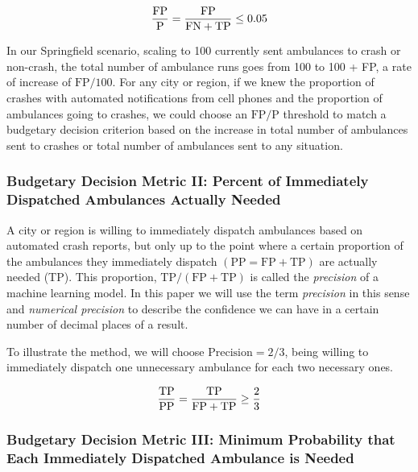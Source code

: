 \begin{equation} \label{eq:budget_1}\hfil
\frac{ \text{FP}}{\text{P}}
=
\frac{ \text{FP}}{\text{FN} + \text{TP}}
\le 0.05
\end{equation}

 In our Springfield scenario, scaling to 100 currently sent ambulances to crash or non-crash, the total number of ambulance runs goes from 100 to 100 + FP, a rate of increase of $\text{FP}/100$.  For any city or region, if we knew the proportion of crashes with automated notifications from cell phones and the proportion of ambulances going to crashes, we could choose an
 $\text{FP}/\text{P}$
 threshold to match a budgetary decision criterion based on the increase in total number of ambulances sent to crashes or total number of ambulances sent to any situation.


\subsubsection{Budgetary Decision Metric II:  Percent of Immediately Dispatched Ambulances Actually Needed}
\label{political_decisions_precision}

A city or region is willing to immediately dispatch ambulances based on automated crash reports, but only up to the point where a certain proportion of the ambulances they immediately dispatch 
$(\text{PP} = \text{FP} + \text{TP})$ 
are actually needed (TP).  This proportion, 
$\text{TP}/(\text{FP} + \text{TP})$ 
is called the {\it precision} of a machine learning model.  In this paper we will use the term {\it precision} in this sense and {\it numerical precision} to describe the confidence we can have in a certain number of decimal places of a result.

To illustrate the method, we will choose $\text{Precision} = 2/3$, being willing to immediately dispatch one unnecessary ambulance for each two necessary ones.

\begin{equation} \label{eq:budget_2}\hfil
\frac{ \text{TP}}{\text{PP}}
=
\frac{ \text{TP}}{\text{FP} + \text{TP}}
\ge \frac{2}{3}
\end{equation}

\subsubsection{Budgetary Decision Metric III:  Minimum Probability that Each Immediately Dispatched Ambulance is Needed}
\label{political_decisions_probability}

